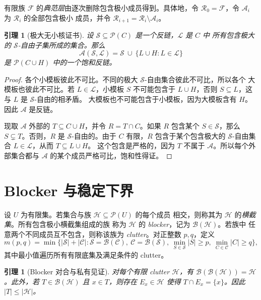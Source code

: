 \documentclass[UTF8,11pt,a4paper,fontset=fandol]{ctexart}
\newtheorem{lemma}[theorem]{引理}
\theoremstyle{definition}
\theoremstyle{remark}
\newcommand{\powerset}{\mathcal{P}}
\newcommand{\family}{\mathcal{F}}
\newcommand{\smallcores}{\mathcal{S}}
\newcommand{\largecores}{\mathcal{L}}
\newcommand{\blocker}{\mathcal{B}}
\begin{document}
有限族 $\family$ 的\emph{典范层}由逐次删除包含极小成员得到。具体地，令
$\mathcal R_0=\family$，令 $\mathcal A_i$ 为 $\mathcal R_i$ 的全部包含极小
成员，并令 $\mathcal R_{i+1}=\mathcal R_i\setminus\mathcal A_i$。

\begin{lemma}[极大无小核证书]
\label{lem:maximal-free}
设 $\smallcores\subseteq\powerset(C)$ 是一个反链，$\largecores$ 是 $C$ 中
所有包含极大的 $\smallcores$-自由子集所成的集合。那么
\[
  \mathcal A(\smallcores,\largecores)
  =\smallcores\ \cup\ \{L\cup H:L\in\largecores\}
\]
是 $\powerset(C\cup H)$ 中的一个饱和反链。
\end{lemma}

\begin{proof}
各个小模板彼此不可比。不同的极大 $\smallcores$-自由集合彼此不可比，所以各个
大模板也彼此不可比。若 $L\in\largecores$，小模板 $S$ 不可能包含于
$L\cup H$，否则 $S\subseteq L$，这与 $L$ 是 $\smallcores$-自由的相矛盾。
大模板也不可能包含于小模板，因为大模板含有 $H$。因此 $\mathcal A$ 是反链。

现取 $\mathcal A$ 外部的 $T\subseteq C\cup H$，并令 $R=T\cap C$。如果
$R$ 包含某个 $S\in\smallcores$，那么 $S\subsetneq T$。否则，$R$ 是
$\smallcores$-自由的。由于 $C$ 有限，$R$ 包含于某个包含极大的
$\smallcores$-自由集合 $L\in\largecores$，从而 $T\subseteq L\cup H$。
这个包含是严格的，因为 $T$ 不属于 $\mathcal A$。所以每个外部集合都与
$\mathcal A$ 的某个成员严格可比，饱和性得证。
\end{proof}

\section{Blocker 与稳定下界}
\label{sec:blockers}

设 $U$ 为有限集。若集合与族 $\mathcal H\subseteq\powerset(U)$ 的每个成员
相交，则称其为 $\mathcal H$ 的\emph{横截集}。所有包含极小横截集组成的族
称为 $\mathcal H$ 的 \emph{blocker}，记为 $\blocker(\mathcal H)$。若族中
任意两个不同成员互不包含，则称该族为 \emph{clutter}。对正整数 $p,q$，定义
\[
  m(p,q)=\min\bigl\{|\mathcal S|+|\mathcal C|:
  \mathcal S=\blocker(\mathcal C),\
  \mathcal C=\blocker(\mathcal S),\
  \min_{S\in\mathcal S}|S|\geq p,\
  \min_{C\in\mathcal C}|C|\geq q\bigr\},
\]
其中最小值遍历所有有限底集及满足条件的 clutter。

\begin{lemma}[Blocker 对合与私有见证]
\label{lem:blocker-basic}
对每个有限 clutter $\mathcal H$，有
$\blocker(\blocker(\mathcal H))=\mathcal H$。此外，若
$T\in\blocker(\mathcal H)$ 且 $x\in T$，则存在
$E_x\in\mathcal H$ 使得 $T\cap E_x=\{x\}$。因此
$|T|\leq|\mathcal H|$。
\end{lemma}
\end{document}
